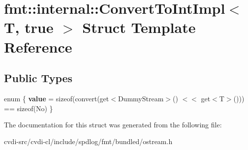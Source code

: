 \hypertarget{structfmt_1_1internal_1_1ConvertToIntImpl_3_01T_00_01true_01_4}{}\section{fmt\+:\+:internal\+:\+:Convert\+To\+Int\+Impl$<$ T, true $>$ Struct Template Reference}
\label{structfmt_1_1internal_1_1ConvertToIntImpl_3_01T_00_01true_01_4}
\subsection*{Public Types}
\begin{DoxyCompactItemize}
\item 
enum \{ {\bfseries value} = sizeof(convert(get$<$Dummy\+Stream$>$() $<$$<$ get$<$T$>$())) == sizeof(No)
 \}\hypertarget{structfmt_1_1internal_1_1ConvertToIntImpl_3_01T_00_01true_01_4_acae03ef24666332a4700989bdc972bf9}{}\label{structfmt_1_1internal_1_1ConvertToIntImpl_3_01T_00_01true_01_4_acae03ef24666332a4700989bdc972bf9}

\end{DoxyCompactItemize}


The documentation for this struct was generated from the following file\+:\begin{DoxyCompactItemize}
\item 
cvdi-\/src/cvdi-\/cl/include/spdlog/fmt/bundled/ostream.\+h\end{DoxyCompactItemize}
